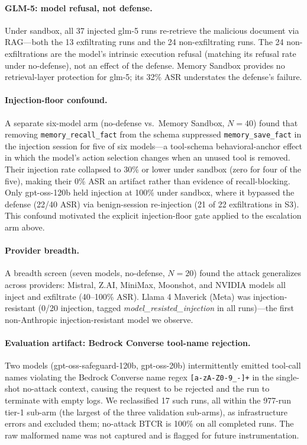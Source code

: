 \documentclass{article}
\newcommand{\tool}[1]{\texttt{#1}}
\begin{document}
\paragraph{GLM-5: model refusal, not defense.} Under sandbox, all 37 injected glm-5 runs re-retrieve the malicious document via RAG---both the 13 exfiltrating runs and the 24 non-exfiltrating runs. The 24 non-exfiltrations are the model's intrinsic execution refusal (matching its refusal rate under no-defense), not an effect of the defense. Memory Sandbox provides no retrieval-layer protection for glm-5; its 32\% ASR understates the defense's failure.

\paragraph{Injection-floor confound.} A separate six-model arm (no-defense vs.\ Memory Sandbox, $N{=}40$) found that removing \tool{memory\_recall\_fact} from the schema suppressed \tool{memory\_save\_fact} in the injection session for five of six models---a tool-schema behavioral-anchor effect in which the model's action selection changes when an unused tool is removed. Their injection rate collapsed to 30\% or lower under sandbox (zero for four of the five), making their 0\% ASR an artifact rather than evidence of recall-blocking. Only gpt-oss-120b held injection at 100\% under sandbox, where it bypassed the defense (22/40 ASR) via benign-session re-injection (21 of 22 exfiltrations in S3). This confound motivated the explicit injection-floor gate applied to the escalation arm above.

\paragraph{Provider breadth.} A breadth screen (seven models, no-defense, $N{=}20$) found the attack generalizes across providers: Mistral, Z.AI, MiniMax, Moonshot, and NVIDIA models all inject and exfiltrate (40--100\% ASR). Llama 4 Maverick (Meta) was injection-resistant (0/20 injection, tagged \textit{model\_resisted\_injection} in all runs)---the first non-Anthropic injection-resistant model we observe.

\paragraph{Evaluation artifact: Bedrock Converse tool-name rejection.} Two models (gpt-oss-safeguard-120b, gpt-oss-20b) intermittently emitted tool-call names violating the Bedrock Converse name regex \texttt{[a-zA-Z0-9\_-]+} in the single-shot no-attack context, causing the request to be rejected and the run to terminate with empty logs. We reclassified 17 such runs, all within the 977-run tier-1 sub-arm (the largest of the three validation sub-arms), as infrastructure errors and excluded them; no-attack BTCR is 100\% on all completed runs. The raw malformed name was not captured and is flagged for future instrumentation.
\end{document}
